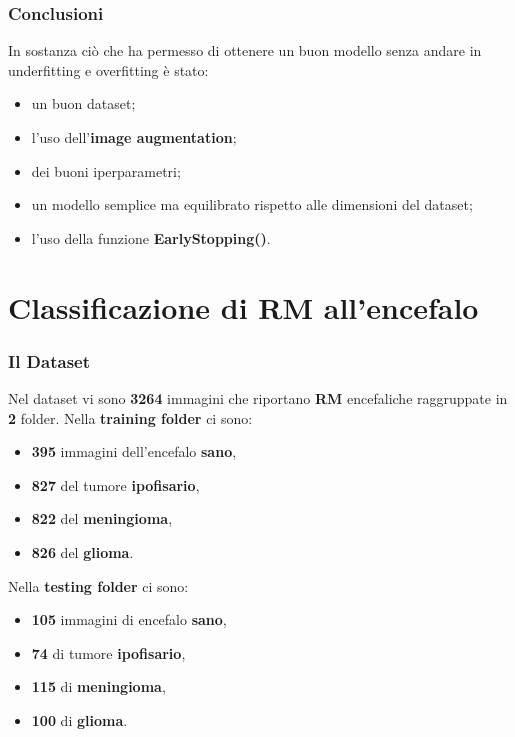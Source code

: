 \documentclass{beamer}
\begin{document}
\begin{frame}
	\frametitle{Conclusioni}
	In sostanza ciò che ha permesso di ottenere un buon modello senza andare in underfitting
	e overfitting è stato:
	\begin{itemize}
		\item un buon dataset;
		\item l'uso dell'\textbf{image augmentation};
		\item dei buoni iperparametri;
		\item un modello semplice ma equilibrato rispetto alle dimensioni del dataset;
		\item l'uso della funzione \textbf{EarlyStopping()}.
	\end{itemize}
	
\end{frame}

\section{Classificazione di RM all'encefalo}


\begin{frame}
	\frametitle{Il Dataset}
	Nel dataset vi sono \textbf{3264} immagini che 
	riportano \textbf{RM} encefaliche raggruppate 
	 in \textbf{2} folder.
Nella \textbf{training folder} ci sono:
\begin{itemize}
	\item \textbf{395} immagini dell’encefalo \textbf{sano},
	\item \textbf{827} del tumore \textbf{ipofisario},
	\item \textbf{822} del \textbf{meningioma},
	\item \textbf{826} del \textbf{glioma}. 
\end{itemize}
Nella \textbf{testing folder} ci sono:
\begin{itemize}
	\item \textbf{105} immagini di encefalo \textbf{sano},
	\item \textbf{74} di tumore \textbf{ipofisario}, 
	\item \textbf{115} di \textbf{meningioma},
	\item \textbf{100} di \textbf{glioma}. 
\end{itemize}
\end{frame}
\end{document}
